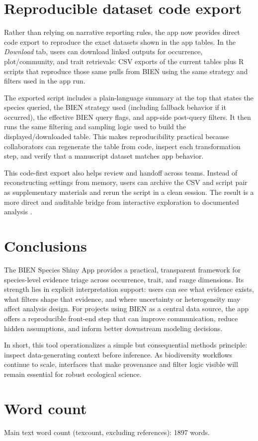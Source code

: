 \documentclass[11pt]{article}
\begin{document}
\section*{Reproducible dataset code export}
Rather than relying on narrative reporting rules, the app now provides direct code export to reproduce the exact datasets shown in the app tables. In the \textit{Download} tab, users can download linked outputs for occurrence, plot/community, and trait retrievals: CSV exports of the current tables plus R scripts that reproduce those same pulls from BIEN using the same strategy and filters used in the app run.

The exported script includes a plain-language summary at the top that states the species queried, the BIEN strategy used (including fallback behavior if it occurred), the effective BIEN query flags, and app-side post-query filters. It then runs the same filtering and sampling logic used to build the displayed/downloaded table. This makes reproducibility practical because collaborators can regenerate the table from code, inspect each transformation step, and verify that a manuscript dataset matches app behavior.

This code-first export also helps review and handoff across teams. Instead of reconstructing settings from memory, users can archive the CSV and script pair as supplementary materials and rerun the script in a clean session. The result is a more direct and auditable bridge from interactive exploration to documented analysis \citep{Enquist2026BIEN, Maitner2025BIEN}.

\section*{Conclusions}
The BIEN Species Shiny App provides a practical, transparent framework for species-level evidence triage across occurrence, trait, and range dimensions. Its strength lies in explicit interpretation support: users can see what evidence exists, what filters shape that evidence, and where uncertainty or heterogeneity may affect analysis design. For projects using BIEN as a central data source, the app offers a reproducible front-end step that can improve communication, reduce hidden assumptions, and inform better downstream modeling decisions.

In short, this tool operationalizes a simple but consequential methods principle: inspect data-generating context before inference. As biodiversity workflows continue to scale, interfaces that make provenance and filter logic visible will remain essential for robust ecological science.




\section*{Word count}
Main text word count (texcount, excluding references): 1897 words.
\end{document}
